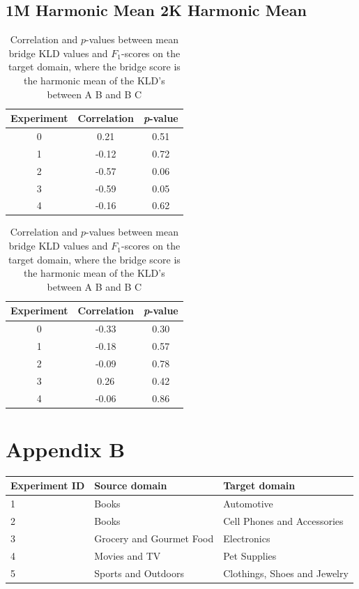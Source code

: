 \documentclass[11pt,a4paper]{article}
\begin{document}
\subsection*{\centering 1M Harmonic Mean \hspace{100} 2K Harmonic Mean}
\begin{table}[h]
\centering
    \begin{tabular}{|c|c|c|}
    \hline
     \textbf{Experiment} & \textbf{Correlation} & \textbf{\textit{p}-value} \\ \hline
     0 & 0.21 & 0.51 \\ \hline
     1 & -0.12 & 0.72 \\ \hline
     2 & -0.57 & 0.06 \\ \hline
     3 & -0.59 & 0.05 \\ \hline
     4 & -0.16 & 0.62 \\ \hline
    \end{tabular}
\hspace{2em}
    \begin{tabular}{|c|c|c|}
    \hline
     \textbf{Experiment} & \textbf{Correlation} & \textbf{\textit{p}-value} \\ \hline
     0 & -0.33 & 0.30 \\ \hline
     1 & -0.18 & 0.57 \\ \hline
     2 & -0.09 & 0.78 \\ \hline
     3 &  0.26 & 0.42 \\ \hline
     4 & -0.06 & 0.86 \\ \hline
    \end{tabular}
\caption{Correlation and $p$-values between mean bridge KLD values and $F_1$-scores on the target domain, where the bridge score is the harmonic mean of the KLD's between A \textrightarrow B and B \textrightarrow C}
\end{table}

\newpage
\section*{Appendix B}

\begin{table}[h]
\centering
\begin{tabular}{|l|l|l|}
\hline
\textbf{Experiment ID} & \textbf{Source domain} & \textbf{Target domain} \\ \hline
1 & Books & Automotive \\ \hline
2 & Books & Cell Phones and Accessories \\ \hline
3 & Grocery and Gourmet Food & Electronics \\ \hline
4 & Movies and TV & Pet Supplies \\ \hline
5 & Sports and Outdoors & Clothings, Shoes and Jewelry \\ \hline
\end{tabular}
\end{table}
\end{document}
